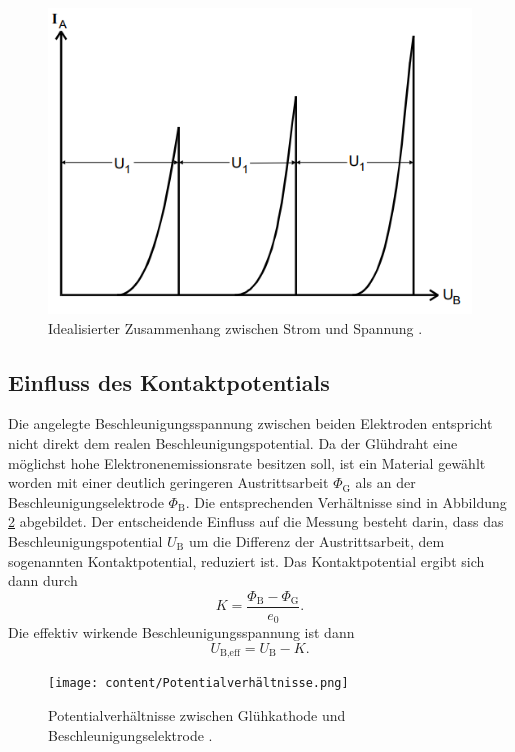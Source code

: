 \begin{figure}[H]
    \centering
    \includegraphics[scale=1]{content/Diskret.png}
    \caption{Idealisierter Zusammenhang zwischen Strom und Spannung \cite{sample}.}
    \label{fig:Diskret}
\end{figure}

\subsection{Einfluss des Kontaktpotentials}
Die angelegte Beschleunigungsspannung zwischen beiden Elektroden entspricht nicht direkt 
dem realen Beschleunigungspotential. Da der Glühdraht eine möglichst hohe Elektronenemissionsrate besitzen soll, ist 
ein Material gewählt worden mit einer deutlich geringeren Austrittsarbeit $\Phi_\text{G}$ als an der Beschleunigungselektrode $\Phi_\text{B}$.
Die entsprechenden Verhältnisse sind in Abbildung \ref{fig:KontaktU} abgebildet. Der entscheidende 
Einfluss auf die Messung besteht darin, dass das Beschleunigungspotential $U_\text{B}$ um
die Differenz der Austrittsarbeit, dem sogenannten Kontaktpotential, reduziert ist.
Das Kontaktpotential ergibt sich dann durch 
\begin{equation}
    K=\frac{\Phi_\text{B}-\Phi_\text{G}}{e_0}.
    \label{eq:Kontakt}
\end{equation}
Die effektiv wirkende Beschleunigungsspannung ist dann
\begin{equation}
    U_\text{B,eff}=U_\text{B}-K.
\end{equation}
\begin{figure}[H]
    \centering
    \texttt{[image: content/Potentialverhältnisse.png]}
    \caption{Potentialverhältnisse zwischen Glühkathode und Beschleunigungselektrode \cite{sample}.}
    \label{fig:KontaktU}
\end{figure}
